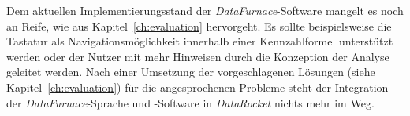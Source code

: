 \documentclass[
  language=german, %
  type=bachelor,%
  ngerman
]{isthesis}
\begin{document}
\begin{content}
Dem aktuellen Implementierungsstand der \textit{DataFurnace}-Software mangelt
es noch an Reife, wie aus Kapitel~\ref{ch:evaluation} hervorgeht. Es sollte
beispielsweise die Tastatur als Navigationsmöglichkeit innerhalb einer
Kennzahlformel unterstützt werden oder der Nutzer mit mehr Hinweisen durch die
Konzeption der Analyse geleitet werden. Nach einer Umsetzung der
vorgeschlagenen Lösungen (siehe Kapitel~\ref{ch:evaluation}) für die
angesprochenen Probleme steht der Integration der \textit{DataFurnace}-Sprache
und -Software in \textit{DataRocket} nichts mehr im Weg.
  

\end{content}



%  







\end{document}
